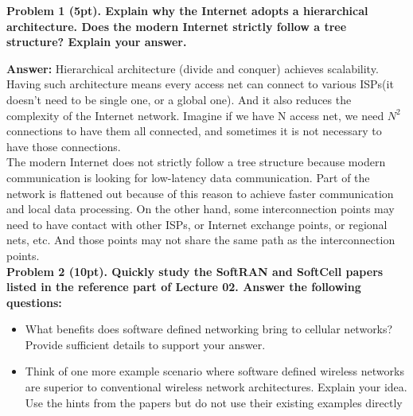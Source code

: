 \documentclass[12pt]{article}
\begin{document}
\noindent \textbf{Problem 1 (5pt). Explain why the Internet adopts a hierarchical architecture. Does the modern Internet strictly follow a tree structure? Explain your answer.\\}


\textbf{Answer:} Hierarchical architecture (divide and conquer) achieves scalability. Having such architecture means every access net can connect to various ISPs(it doesn't need to be single one, or a global one). And it also reduces the complexity of the Internet network. Imagine if we have N access net, we need $N^2$ connections to have them all connected, and sometimes it is not necessary to have those connections. \\
\indent The modern Internet does not strictly follow a tree structure because modern communication is looking for low-latency data communication. Part of the network is flattened out because of this reason to achieve faster communication and local data processing. On the other hand, some interconnection points may need to have contact with other ISPs, or Internet exchange points, or regional nets, etc. And those points may not share the same path as the interconnection points. \\




\noindent \textbf{Problem 2 (10pt). Quickly study the SoftRAN and SoftCell papers listed in the reference part of Lecture 02. Answer the following questions:}\\
\begin{itemize}
    \item What benefits does software defined networking bring to cellular networks? Provide
sufficient details to support your answer. 
    \item Think of one more example scenario where software defined wireless networks are
superior to conventional wireless network architectures. Explain your idea. Use the hints
from the papers but do not use their existing examples directly
\end{itemize}
\end{document}
